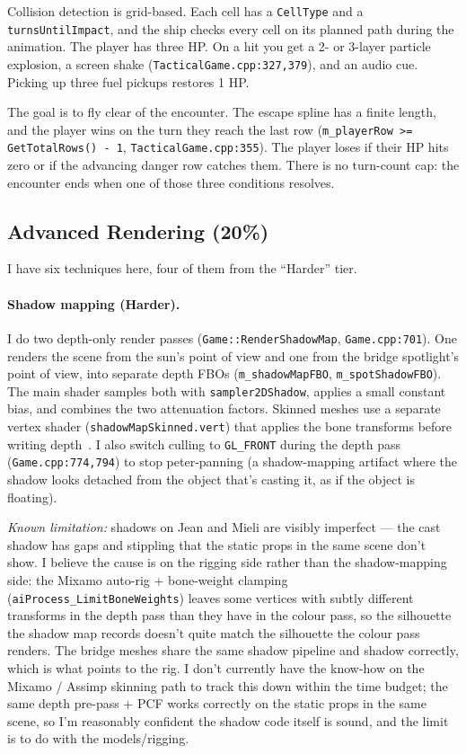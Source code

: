 \documentclass[11pt,a4paper]{article}
\begin{document}
Collision detection is grid-based. Each cell has a \texttt{CellType} and a
\texttt{turnsUntilImpact}, and the ship checks every cell on its planned
path during the animation. The player has three HP. On a hit you get a
2- or 3-layer particle explosion, a screen shake
(\texttt{TacticalGame.cpp:327,379}), and an audio cue. Picking up three
fuel pickups restores 1 HP.

The goal is to fly clear of the encounter. The escape spline has a
finite length, and the player wins on the turn they reach the last row
(\texttt{m\_playerRow >= GetTotalRows() - 1}, \texttt{TacticalGame.cpp:355}).
The player loses if their HP hits zero or if the advancing danger row
catches them. There is no turn-count cap: the encounter ends when one
of those three conditions resolves.


\subsection{Advanced Rendering (20\%)}

I have six techniques here, four of them from the ``Harder'' tier.

\paragraph{Shadow mapping (Harder).}
I do two depth-only render passes (\texttt{Game::RenderShadowMap},
\texttt{Game.cpp:701}). One renders the scene from the sun's point of view
and one from the bridge spotlight's point of view, into separate depth FBOs
(\texttt{m\_shadowMapFBO}, \texttt{m\_spotShadowFBO}). The main shader
samples both with \texttt{sampler2DShadow}, applies a small constant bias,
and combines the two attenuation factors. Skinned meshes use a separate
vertex shader (\texttt{shadowMapSkinned.vert}) that applies the bone
transforms before writing depth~\cite{learnopengl_shadows}. I also switch
culling to \texttt{GL\_FRONT} during the depth pass
(\texttt{Game.cpp:774,794}) to stop peter-panning (a shadow-mapping
artifact where the shadow looks detached from the object that's casting
it, as if the object is floating).

\emph{Known limitation:} shadows on Jean and Mieli are visibly
imperfect — the cast shadow has gaps and stippling that the static props
in the same scene don't show. I believe the cause is on the rigging side
rather than the shadow-mapping side: the Mixamo auto-rig + bone-weight
clamping (\texttt{aiProcess\_LimitBoneWeights}) leaves some vertices
with subtly different transforms in the depth pass than they have in
the colour pass, so the silhouette the shadow map records doesn't quite
match the silhouette the colour pass renders. The bridge meshes share
the same shadow pipeline and shadow correctly, which is what points to
the rig. I don't currently have the know-how on the Mixamo / Assimp
skinning path to track this down within the time budget; the same depth
pre-pass + PCF works correctly on the static props in the same scene,
so I'm reasonably confident the shadow code itself is sound, and the limit is to do with
the models/rigging.
\end{document}
